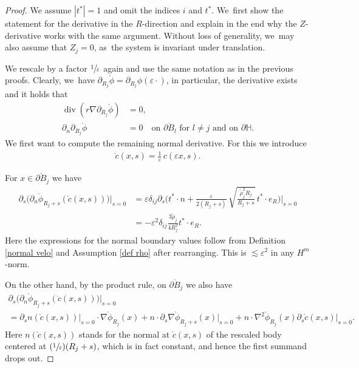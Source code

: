 \documentclass[10pt]{amsart}
\let\epsilon\varepsilon
\newcommand{\Psfrac}[2]{(\sfrac{#1}{#2})}
\theoremstyle{definition}
\renewcommand{\div}{\operatorname{div}}
\newcommand\eq{=}
\let\de\partial
\let\eps\epsilon
\begin{document}
\begin{proof}
We assume $|t^*|=1$ and omit the indices $i$ and $t^*$. We~first show the statement for the derivative in the $R$-direction and explain in the end why the $Z$-derivative works with the same argument. Without loss of generality, we~may also assume that $Z_j=0$, as~the system is invariant under translation.

We rescale by a factor $\sfrac{1}{\eps}$ again and use the same notation as in the previous proofs. Clearly, we~have $\de_{R_j}\grave{\phi}=\de_{R_j}\phi(\eps\cdot)$, in particular, the derivative exists and it holds that
\begin{align}
\div(r\nabla\de_{R_j}\grave{\phi})&\eq0,\label{eq deri}\\
\de_n\de_{R_j}\grave{\phi}&\eq0 \quad\text{on $\de\grave{B}_l$ for $l\neq j$ and on $\de\mathbb{H}$}.\label{boundary deri 1}
\end{align}
We first want to compute the remaining normal derivative. For this we introduce
\begin{align*}\grave{c}(x,s)\eq\frac{1}{\eps}\,c(\eps x,s).
\end{align*}

For $x\in \de\grave{B}_j$ we have
\begin{equation}\begin{aligned}\label{s deri 1}
\de_s\bigl(\de_n\grave{\phi}_{R_j+s}(\grave{c}(x,s))\bigr)\big|_{s=0}&\eq\eps\delta_{ij}\de_s\biggl(t^*\cdot n+\frac{\eps}{2(R_j+s)}\,\sqrt{\frac{\tilde{\rho}_j^2R_j}{R_j+s}}\,t^*\cdot e_R \biggr)\bigg|_{s=0}\\
&\eq -\eps^2\delta_{ij}\frac{3\tilde{\rho}_j}{4R_j^2}t^*\cdot e_R.
\end{aligned}\end{equation}
Here the expressions for the normal boundary values follow from Definition \eqref{normal velo} and Assumption \eqref{def rho} after rearranging. This is $\lesssim \eps^2$ in any $H^m$-norm.

On the other hand, by the product rule, on $\de\grave{B}_j$ we also have
\begin{multline}\label{s deri 2}
\de_s\bigl(\de_n\grave{\phi}_{R_j+s}(\grave{c}(x,s))\bigr)\big|_{s=0}\\
\eq\de_s n(\grave{c}(x,s))\big|_{s=0}\cdot\nabla\grave{\phi}_{R_j}(x)+n\cdot\de_{s}\nabla\grave{\phi}_{R_j+s}(x)\big|_{s=0}+n\cdot \nabla^2\grave{\phi}_{R_j}(x)\de_s\grave{c}(x,s)\big|_{s=0}.
\end{multline}
Here $n(\grave{c}(x,s))$ stands for the normal at $\grave{c}(x,s)$ of the rescaled body centered at $\Psfrac{1}{\eps}(R_j+s)$, which is in fact constant, and hence the first summand drops out.


\end{proof}
\end{document}
